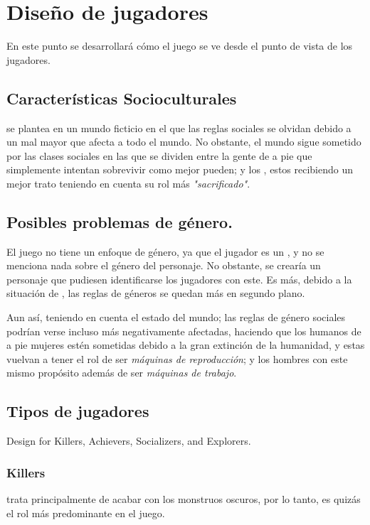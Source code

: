 
\section{Diseño de jugadores}
    En este punto se desarrollará cómo el juego se ve desde el punto de vista de los jugadores.
    \subsection{Características Socioculturales}
        \TWD se plantea en un mundo ficticio en el que las reglas sociales se olvidan debido a un mal mayor que afecta a todo el mundo. No obstante, el mundo sigue sometido por las clases sociales en las que se dividen entre la gente de a pie que simplemente intentan sobrevivir como mejor pueden; y los \hunters, estos recibiendo un mejor trato teniendo en cuenta su rol más \textit{"sacrificado"}.
    \subsection{Posibles problemas de género.}
        El juego no tiene un enfoque de género, ya que el jugador es un \hunters, y no se menciona nada sobre el género del personaje. No obstante, se crearía un personaje que pudiesen identificarse los jugadores con este. Es más, debido a la situación de \humanity, las reglas de géneros se quedan más en segundo plano.

        Aun así, teniendo en cuenta el estado del mundo; las reglas de género sociales podrían verse incluso más negativamente afectadas, haciendo que los humanos de a pie mujeres estén sometidas debido a la gran extinción de la humanidad, y estas vuelvan a tener el rol de ser \textit{máquinas de reproducción}; y los hombres con este mismo propósito además de ser \textit{máquinas de trabajo}.
    \subsection{Tipos de jugadores}
    Design for Killers, Achievers, Socializers, and Explorers.
        \subsubsection{Killers}
            \TWD trata principalmente de acabar con los monstruos oscuros, por lo tanto, es quizás el rol más predominante en el juego.
